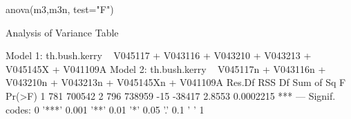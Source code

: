 \begin{Schunk}
\begin{Sinput}
 anova(m3,m3n, test="F")
\end{Sinput}
\begin{Soutput}
Analysis of Variance Table

Model 1: th.bush.kerry ~ V045117 + V043116 + V043210 + V043213 + V045145X + 
    V041109A
Model 2: th.bush.kerry ~ V045117n + V043116n + V043210n + V043213n + V045145Xn + 
    V041109A
  Res.Df    RSS  Df Sum of Sq      F    Pr(>F)    
1    781 700542                                   
2    796 738959 -15    -38417 2.8553 0.0002215 ***
---
Signif. codes:  0 '***' 0.001 '**' 0.01 '*' 0.05 '.' 0.1 ' ' 1
\end{Soutput}
\end{Schunk}
